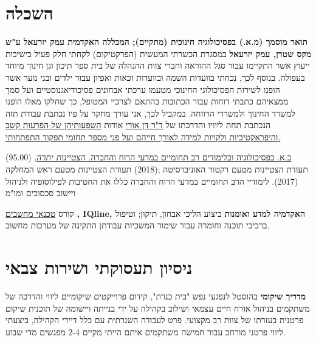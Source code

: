 \section{השכלה}

{\textbf{תואר מוסמך (מ.א.) בפסיכולוגיה חינוכית (מתקיים); המכללה האקדמית עמק יזרעאל ע"ש מקס שטרן, עמק יזרעאל}}
{במסגרת הכשרתי המעשית (הפרקטיקום) לקחתי חלק פעיל בישיבות ייעוץ אשר התקיימו עבור סגל ההוראה וחברי צוות ההנהלה של בית ספר תיכון וגן חינוך מיוחד בעפולה. בנוסף לכך, נכחתי בוועדות השמה ובוועדות זכאות ואפיון עבור ילדים ובני נוער אשר הופנו לשירות הפסיכולוגי החינוכי מטעמו  ערכתי אבחונים פסיכודיאגנוסטיים ועל סמך ממצאיהם כתבתי דוחות עבור הכתובות בהתאם לצרכיי המטופל, כך שחלקו מאלו הופנו למשרד החינוך ולמשרדי הרווחה. במקביל לכך, אני עורך מחקר על פיו נכתבת עבודת תזה הנכתבת תחת ליוויו והדרכתו של 
	\href{https://www.researchgate.net/scientific-contributions/Orrie-Dan-2172412162}{ד"ר דן אורי} אודות 
	\href{https://tinyurl.com/ADHD-Coping-Seminar}{השפעותיהן של הפרעות קשב והיפראקטיביות ולקויות למידה לאורך חייהם ועל פני מספר תחומי תפקוד התפתחותי.}}
{}

{\href{https://www.dropbox.com/s/pcm0mybvgi85ma0/BA-Psych.pdf}{ב.א. בפסיכולוגיה ובלימודים רב תחומיים במדעי הרוח והחברה. \textit{הצטיינות יתרה}}, 
(95.00)}
{תעודת הצטיינות מטעם רקטור האוניברסיטה ;(2018) תעודת הצטיינות מטעם ראש המחלקה (2017).
לימודיי הרב תחומיים במדעי הרוח והחברה כללו את החטיבות לפילוסופיה ולניהול ויישוב סכסוכים ומו"מ}
{}

\par{\par}

 {קורס
\href{https://www.dropbox.com/s/csphxdynjdg3ze2/computer-technitian-certificate.jpg}{טכנאי מחשבים}
		\textbf{, IQline, האקדמיה למדע ואומנות}}
{ביצוע הליכי אבחון, תיקון; וטיפול ברכיבי תוכנה וחומרה עבור שימור המשכיות עבודתן התקינה של מערכות מחשוב.}
{}
{}

\section{ניסיון תעסוקתי ושירות צבאי}

{\textbf{מדריך שיקומי}  בהוסטל לנפגעי נפש "בית כנרת", קידום פרוייקטים שיקומיים}
{ליווי והדרכה של משתקמים בניהול אורח חיים עצמאי ושילוב בקהילה על ידי בנייתה ויישומה של תוכנית שיקום פרטנית בעזרתו של צוות רב מקצועי. פרט לעבודה השגרתית עם כלל דיירי הקהילה, ביצעתי ליווי פרטני מורחב עבור חמישה משתקמים איתם הייתי מקיים 2-4 מפגשים מדי שבוע.}
{}


